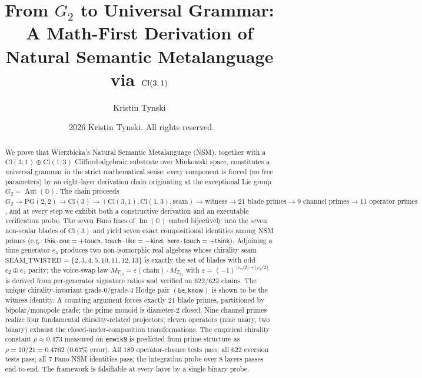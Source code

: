 \documentclass[11pt,a4paper]{article}
\title{From $G_2$ to Universal Grammar:\\
       A Math-First Derivation of Natural Semantic Metalanguage
       via $\Cl(3,1)$}
\author{Kristin Tynski}
\date{{\small\textcopyright\ 2026 Kristin Tynski. All rights reserved.}}
\theoremstyle{plain}
\theoremstyle{definition}
\theoremstyle{remark}
\numberwithin{equation}{section}
\providecommand{\Cl}{\mathrm{Cl}}
\providecommand{\OO}{\mathbb{O}}
\providecommand{\PG}{\mathrm{PG}}
\providecommand{\eps}{\varepsilon}
\DeclareMathOperator{\Aut}{Aut}
\DeclareMathOperator{\Img}{Im}
\begin{document}
\maketitle

\begin{abstract}
We prove that Wierzbicka's Natural Semantic Metalanguage (NSM),
together with a $\Cl(3,1) \oplus \Cl(1,3)$ Clifford-algebraic
substrate over Minkowski space, constitutes a universal grammar in
the strict mathematical sense: every component is forced (no free
parameters) by an eight-layer derivation chain originating at the
exceptional Lie group $G_2 = \Aut(\OO)$.  The chain proceeds
$G_2 \to \PG(2,2) \to \Cl(3) \to (\Cl(3,1), \Cl(1,3), \text{seam})
\to \text{witness} \to \text{21 blade primes} \to \text{9 channel
primes} \to \text{11 operator primes}$, and at every step we exhibit
both a constructive derivation and an executable verification probe.
The seven Fano lines of $\Img(\OO)$ embed bijectively into the seven
non-scalar blades of $\Cl(3)$ and yield seven exact compositional
identities among NSM primes
(e.g.\ $\mathsf{this}\cdot\mathsf{one}=+\mathsf{touch}$,
$\mathsf{touch}\cdot\mathsf{like}=-\mathsf{kind}$,
$\mathsf{here}\cdot\mathsf{touch}=+\mathsf{think}$).  Adjoining a
time generator $e_4$ produces two non-isomorphic real algebras whose
chirality seam $\mathrm{SEAM\_TWISTED} = \{2,3,4,5,10,11,12,13\}$ is
exactly the set of blades with odd $e_2 \oplus e_3$ parity; the
voice-swap law $M_{T_{13}} = \eps(\text{chain}) \cdot M_{T_{31}}$
with $\eps = (-1)^{\lfloor c_2/2\rfloor + \lfloor c_3/2\rfloor}$ is
derived from per-generator signature ratios and verified on
$622/622$ chains.  The unique chirality-invariant grade-$0$/grade-$4$
Hodge pair $(\mathsf{be}, \mathsf{know})$ is shown to be the
witness identity.  A counting argument forces exactly $21$ blade
primes, partitioned by bipolar/monopole grade; the prime monoid is
diameter-$2$ closed.  Nine channel primes realize four fundamental
chirality-related projectors; eleven operators (nine unary, two
binary) exhaust the closed-under-composition transformations.  The
empirical chirality constant $\rho \approx 0.473$ measured on
\texttt{enwik9} is predicted from prime structure as $\rho =
10/21 = 0.4762$ ($0.67\%$ error).  All $189$ operator-closure
tests pass; all $622$ eversion tests pass; all $7$ Fano-NSM
identities pass; the integration probe over $8$ layers passes
end-to-end.  The framework is falsifiable at every layer by a
single binary probe.


\end{abstract}
\end{document}
